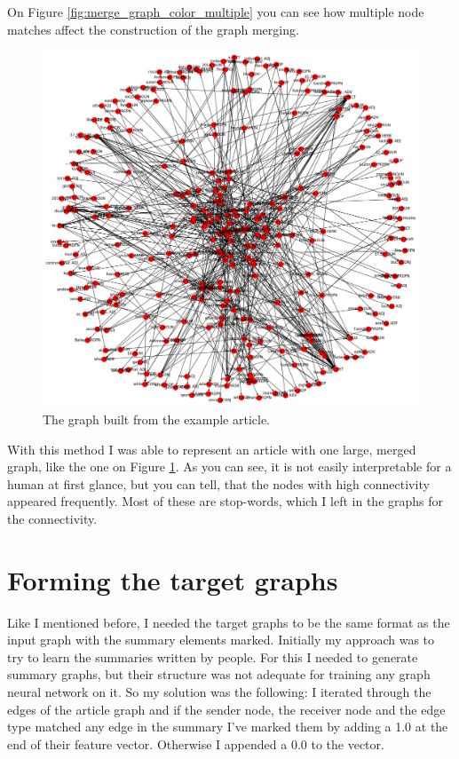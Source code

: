 On Figure \ref{fig:merge_graph_color_multiple} you can see how multiple node matches affect the construction of the graph merging.

\begin{figure}[!ht]
	\centering
	\includegraphics[width=150mm, keepaspectratio]{figures/usain_bolt_article.png}
	\caption{The graph built from the example article.}
	\label{fig:usain_article_graph}
\end{figure}

With this method I was able to represent an article with one large, merged graph, like the one on Figure \ref{fig:usain_article_graph}. As you can see, it is not easily interpretable for a human at first glance, but you can tell, that the nodes with high connectivity appeared frequently. Most of these are stop-words, which I left in the graphs for the connectivity.

\FloatBarrier
\section{Forming the target graphs}
Like I mentioned before, I needed the target graphs to be the same format as the input graph with the summary elements marked. Initially my approach was to try to learn the summaries written by people. For this I needed to generate summary graphs, but their structure was not adequate for training any graph neural network on it. So my solution was the following: I iterated through the edges of the article graph and if the sender node, the receiver node and the edge type matched any edge in the summary I've marked them by adding a 1.0 at the end of their feature vector. Otherwise I appended a 0.0 to the vector.

